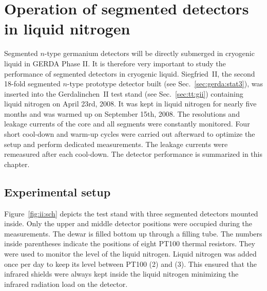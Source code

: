 \chapter[Operation of segmented detectors in LN$_{2}$]{Operation of
segmented detectors in liquid nitrogen}
\label{cha:GII}
Segmented $n$-type germanium detectors will be directly submerged in
cryogenic liquid in GERDA Phase II. It is therefore very important to
study the performance of segmented detectors in cryogenic
liquid. Siegfried~II, the second 18-fold segmented $n$-type prototype
detector built (see Sec.~\ref{sec:gerda:stat3}), was inserted into the
Gerdalinchen~II test stand (see Sec.~\ref{sec:tt:gii}) containing
liquid nitrogen on April 23rd, 2008. It was kept in liquid nitrogen
for nearly five months and was warmed up on September 15th, 2008. The
resolutions and leakage currents of the core and all segments were
constantly monitored. Four short cool-down and warm-up cycles were
carried out afterward to optimize the setup and perform dedicated
measurements. The leakage currents were remeasured after each
cool-down. The detector performance is summarized in this chapter.


\section{Experimental setup}
\label{sec:gii:setup}
Figure~\ref{fig:ii:sch} depicts the test stand with three segmented
detectors mounted inside. Only the upper and middle detector positions
were occupied during the measurements. The dewar is filled bottom up
through a filling tube. The numbers inside parentheses indicate the
positions of eight PT100 thermal resistors. They were used to monitor
the level of the liquid nitrogen. Liquid nitrogen was added once per
day to keep its level between PT100 (2) and (3). This ensured that the
infrared shields were always kept inside the liquid nitrogen
minimizing the infrared radiation load on the detector.

